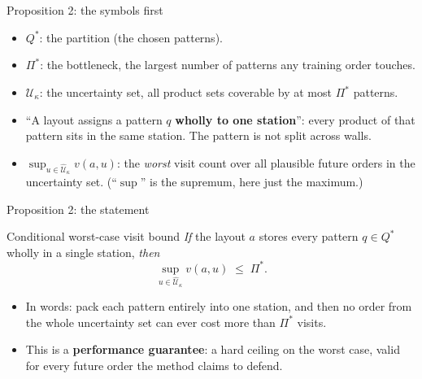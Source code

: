 \documentclass[11pt,aspectratio=169]{beamer}
\newcommand{\term}[1]{\textcolor{blue!60!black}{\textbf{#1}}}
\begin{document}
\begin{frame}{Proposition 2: the symbols first}
  \begin{itemize}
    \item $Q^*$: the partition (the chosen patterns).
    \item $\Pi^*$: the bottleneck, the largest number of patterns any training order touches.
    \item $\widehat{\mathcal U}_\kappa$: the uncertainty set, all product sets coverable by at most $\Pi^*$ patterns.
    \item ``A layout assigns a pattern $q$ \term{wholly to one station}'': every product of that pattern sits in the same station. The pattern is not split across walls.
    \item $\sup_{u\in\widehat{\mathcal U}_\kappa} v(a,u)$: the \emph{worst} visit count over all plausible future orders in the uncertainty set. (``$\sup$'' is the supremum, here just the maximum.)
  \end{itemize}
\end{frame}

\begin{frame}{Proposition 2: the statement}
  \begin{block}{Conditional worst-case visit bound}
  \emph{If} the layout $a$ stores every pattern $q\in Q^*$ wholly in a single station, \emph{then}
  \[
  \sup_{u\in\widehat{\mathcal U}_\kappa} v(a,u) \;\le\; \Pi^*.
  \]
  \end{block}
  \begin{itemize}
    \item In words: pack each pattern entirely into one station, and then no order from the whole uncertainty set can ever cost more than $\Pi^*$ visits.
    \item This is a \term{performance guarantee}: a hard ceiling on the worst case, valid for every future order the method claims to defend.
  \end{itemize}
\end{frame}
\end{document}
